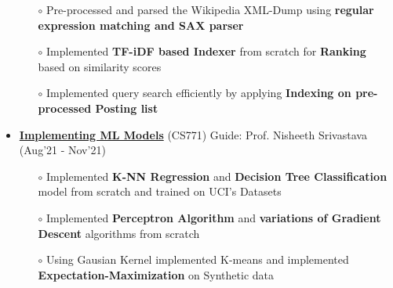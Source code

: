 \documentclass[10.8pt, a4paper]{extarticle}
\begin{document}
\begin{itemize}
\begin{itemize}
	\item [$\circ$] Pre-processed and parsed the Wikipedia XML-Dump using \textbf{regular expression matching and SAX parser}\\[-0.6cm]
	
	
	\item [$\circ$] Implemented \textbf{TF-iDF based Indexer} from scratch for \textbf{Ranking} based on similarity scores\\[-0.6cm]
	
	\item [$\circ$] Implemented query search efficiently by applying \textbf{Indexing on pre-processed Posting list}
	 
    
    \end{itemize}

 \item\href{https://github.com/jeetsarangi/Machine-Learning-CS771-}{\textbf{Implementing ML Models}} (CS771) Guide: Prof. Nisheeth Srivastava \hfill(Aug'21 - Nov'21)
    \\[-0.6cm]
	\begin{itemize}
	   
	      \item [$\circ$]Implemented \textbf{K-NN Regression} and \textbf{Decision Tree Classification} model  from scratch and trained on UCI's Datasets\\[-0.6cm]
	      \item [$\circ$] Implemented \textbf {Perceptron Algorithm} and \textbf {variations of Gradient Descent} algorithms from scratch\\[-0.6cm]
	      \item [$\circ$]Using Gausian Kernel implemented K-means and implemented \textbf {Expectation-Maximization} on Synthetic data\\[-0.6cm]
	      

\end{itemize}
\end{itemize}
\end{document}
